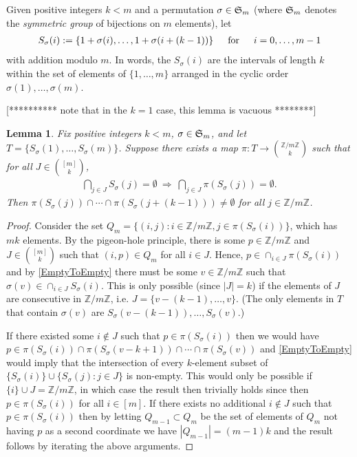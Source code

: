 \documentclass[journal, onecolumn]{IEEEtran}
\newtheorem{lemma}{Lemma}
\begin{document}
Given positive integers $k < m$ and a permutation $\sigma \in \frak{S}_m$ (where $\frak{S}_m$ denotes the \textit{symmetric group} of bijections on $m$ elements), let
\begin{align}
S_\sigma(i) := \{1+\sigma(i), \ldots, 1+\sigma(i + (k-1)) \} \indent \text{for} \indent i = 0, \ldots, m-1
\end{align}
%
with addition modulo $m$. In words, the $S_\sigma(i)$ are the intervals of length $k$ within the set of elements of $\{1, \ldots, m\}$ arranged in the cyclic order $\sigma(1), \ldots, \sigma(m)$.

[********** note that in the $k =1$ case, this lemma is vacuous ********]
\begin{lemma}\label{NonEmptyLemma} Fix positive integers $k < m$, $\sigma \in \frak{S}_m$, and let $T = \{S_\sigma(1), \ldots, S_\sigma(m)\}$. Suppose there exists a map $\pi: T \to {\mathbb{Z}/m\mathbb{Z} \choose k}$ such that for all $J \in {[m] \choose k}$,
\begin{align}\label{EmptyToEmpty}
 \bigcap_{j \in J} S_\sigma(j) = \emptyset \ \Longrightarrow \ \bigcap_{j \in J} \pi(S_\sigma(j)) = \emptyset.
\end{align}
%
Then  $\pi(S_\sigma(j)) \cap \cdots \cap \pi(S_\sigma(j+(k-1))) \neq \emptyset$ for all $j \in \mathbb{Z}/m\mathbb{Z}$.
\end{lemma}

\begin{proof} Consider the set $Q_m = \{ (i,j) : i \in \mathbb{Z}/m\mathbb{Z}, j \in \pi(S_\sigma(i)) \}$, which has $mk$ elements. By the pigeon-hole principle, there is some $p \in \mathbb{Z}/m\mathbb{Z}$ and $J \in {[m] \choose k}$ such that $(i, p) \in Q_m$ for all $i \in J$. Hence, $p \in \cap_{i \in J} \pi(S_\sigma(i))$ and by \eqref{EmptyToEmpty} there must be some $v \in \mathbb{Z}/m\mathbb{Z}$ such that $\sigma(v) \in \cap_{i \in J} S_\sigma(i)$. This is only possible (since $|J| = k$) if the elements of $J$ are consecutive in $\mathbb{Z}/m\mathbb{Z}$, i.e. $J = \{v - (k-1), \ldots, v\}$. (The only elements in $T$ that contain $\sigma(v)$ are $S_\sigma(v-(k-1)), \ldots, S_\sigma(v)$.)

If there existed some $i \notin J$ such that $p \in \pi(S_\sigma(i))$ then we would have $p \in \pi(S_\sigma(i)) \cap \pi(S_\sigma(v - k+1)) \cap \cdots \cap \pi(S_\sigma(v))$ and \eqref{EmptyToEmpty} would imply that the intersection of every $k$-element subset of $\{S_\sigma(i)\} \cup \{S_\sigma(j): j \in J\}$ is non-empty. This would only be possible if $\{i\} \cup J = \mathbb{Z}/m\mathbb{Z}$, in which case the result then trivially holds since then $p \in \pi(S_\sigma(i))$ for all $i \in [m]$. If there exists no additional $i \notin J$ such that $p \in \pi(S_\sigma(i))$ then by letting $Q_{m-1} \subset Q_m$ be the set of elements of $Q_m$ not having $p$ as a second coordinate we have $|Q_{m-1}| = (m-1)k$ and the result follows by iterating the above arguments.
\end{proof}
\end{document}

